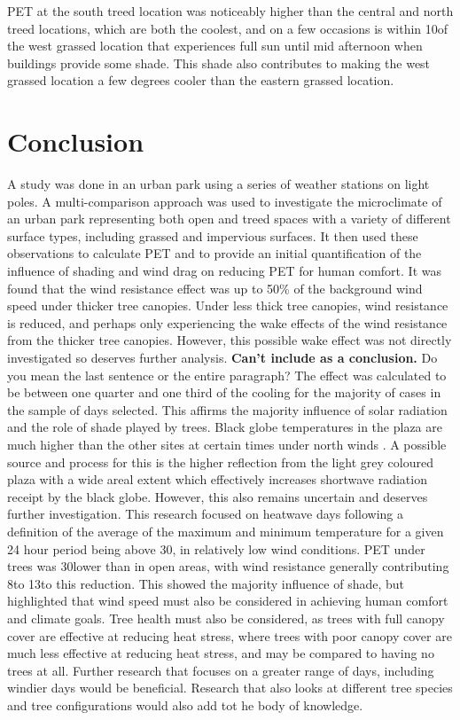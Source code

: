 \documentclass[twocolumn, a4paper]{article}
\providecommand{\comment}[1]{{\large\bf #1}}
\begin{document}
PET at the south treed location was noticeably higher than the central and north treed locations, which are both the coolest, and on a few occasions is within 10\celsius of the west grassed location that experiences full sun until mid afternoon when buildings provide some shade. This shade also contributes to making the west grassed location a few degrees cooler than the eastern grassed location.

\section{Conclusion}
A study was done in an urban park using a series of weather stations on light poles. A multi-comparison approach was used to investigate the microclimate of an urban park representing both open and treed spaces with a variety of different surface types, including grassed and impervious surfaces. It then used these observations to calculate PET and to provide an initial quantification of the influence of shading and wind drag on reducing PET for human comfort.
It was found that the wind resistance effect was up to 50\% of the background wind speed under thicker tree canopies. Under less thick tree canopies, wind resistance is reduced, and perhaps only experiencing the wake effects of the wind resistance from the thicker tree canopies. However, this possible wake effect was not directly investigated so deserves further analysis. \comment{Can't include as a conclusion.} Do you mean the last sentence or the entire paragraph?
The effect was calculated to be between one quarter and one third of the cooling for the majority of cases in the sample of days selected. This affirms the majority influence of solar radiation and the role of shade played by trees.
Black globe temperatures in the plaza are much higher than the other sites at certain times under north winds \cite{RN2100}. A possible source and process for this is the higher reflection from the light grey coloured plaza with a wide areal extent which effectively increases shortwave radiation receipt by the black globe. However, this also remains uncertain and deserves further investigation. This research focused on heatwave days following a definition of the average of the maximum and minimum temperature for a given 24 hour period being above 30\celsius, in relatively low wind conditions.
PET under trees was 30\celsius lower than in open areas, with wind resistance generally contributing 8\celsius to 13\celsius to this reduction. This showed the majority influence of shade, but highlighted that wind speed must also be considered in achieving human comfort and climate goals. Tree health must also be considered, as trees with full canopy cover are effective at reducing heat stress, where trees with poor canopy cover are much less effective at reducing heat stress, and may be compared to having no trees at all.
Further research that focuses on a greater range of days, including windier days would be beneficial. Research that also looks at different tree species and tree configurations would also add tot he body of knowledge.
\end{document}
